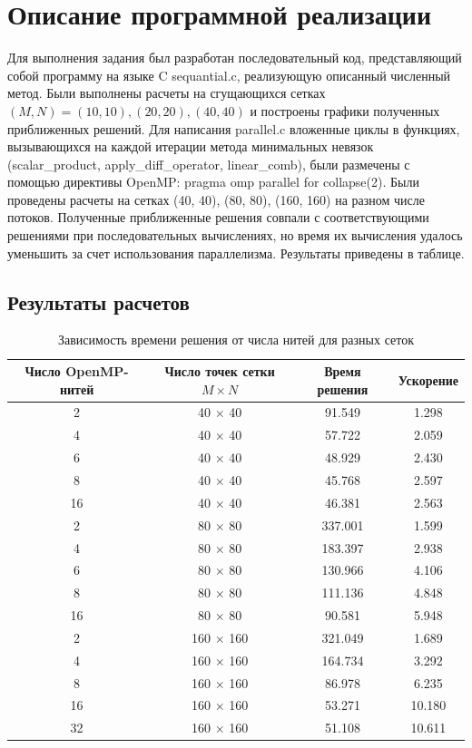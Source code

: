\documentclass[oneside,final,14pt]{extreport}
\begin{document}
\section{Описание программной реализации}
\noindent
Для выполнения задания был разработан последовательный код, представляющий
собой программу на языке C sequantial.c, реализующую описанный численный метод.
Были выполнены расчеты на сгущающихся сетках
\( (M, N) = (10, 10), (20, 20), (40, 40) \) и построены графики
полученных приближенных решений.
Для написания parallel.c вложенные циклы в функциях,
вызывающихся на каждой итерации метода минимальных
невязок (scalar\_product, apply\_diff\_operator, linear\_comb), были
размечены с помощью директивы OpenMP: pragma omp parallel for collapse(2). 
Были проведены расчеты на сетках (40, 40), (80, 80), (160, 160) на разном
числе потоков. Полученные приближенные решения совпали с соответствующими
решениями при последовательных вычислениях, но время их вычисления удалось
уменьшить за счет использования параллелизма. Результаты приведены в таблице.
\subsection{Результаты расчетов}
\noindent
\begin{table}[ht]
\begin{tabular}{|c|c|c|c|}
\hline
Число OpenMP-нитей & Число точек сетки \(M \times N\) &
Время решения & Ускорение \\
\hline
2  & 40 \(\times\) 40 & 91.549 & 1.298 \\
4  & 40 \(\times\) 40 & 57.722 & 2.059 \\
6  & 40 \(\times\) 40 & 48.929 & 2.430 \\
8  & 40 \(\times\) 40 & 45.768 & 2.597 \\
16 & 40 \(\times\) 40 & 46.381 & 2.563 \\
\hline
2  & 80 \(\times\) 80 & 337.001 & 1.599 \\
4  & 80 \(\times\) 80 & 183.397 & 2.938 \\
6  & 80 \(\times\) 80 & 130.966 & 4.106 \\
8  & 80 \(\times\) 80 & 111.136 & 4.848 \\
16 & 80 \(\times\) 80 & 90.581  & 5.948 \\
\hline
2  & 160 \(\times\) 160 & 321.049 & 1.689  \\
4  & 160 \(\times\) 160 & 164.734 & 3.292  \\
8  & 160 \(\times\) 160 & 86.978  & 6.235  \\
16 & 160 \(\times\) 160 & 53.271  & 10.180 \\
32 & 160 \(\times\) 160 & 51.108  & 10.611 \\
\hline
\end{tabular}
\caption{Зависимость времени решения от числа нитей для разных сеток}
\label{tab1}
\end{table}
\end{document}
